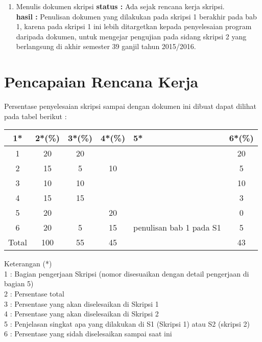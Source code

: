 \documentclass[a4paper,twoside]{article}
\begin{document}
\begin{enumerate}
		\item Menulis dokumen skripsi
		{\bf status :} Ada sejak rencana kerja skripsi.\\
		{\bf hasil :} Penulisan dokumen yang dilakukan pada skripsi 1 berakhir pada bab 1, karena pada skripsi 1 ini lebih ditargetkan kepada penyelesaian program daripada dokumen, untuk mengejar pengujian pada sidang skripsi 2 yang berlangsung di akhir semester 39 ganjil tahun 2015/2016. 
	
	\end{enumerate}

\section{Pencapaian Rencana Kerja}
Persentase penyelesaian skripsi sampai dengan dokumen ini dibuat dapat dilihat pada tabel berikut :

\begin{center}
  \begin{tabular}{ | c | c | c | c | l | c |}
    \hline
    1*  & 2*(\%) & 3*(\%) & 4*(\%) &5* &6*(\%)\\ \hline \hline
    1   & 20  & 20  &  & & 20 \\ \hline
    2   & 15 & 5  & 10  & & 5 \\ \hline
    3   & 10  & 10  &  &  & 10 \\ \hline
    4   & 15  & 15  &   &  & 3 \\ \hline
    5   & 20 &   & 20 & & 0 \\ \hline
    6   & 20 & 	5 & 15  & {\footnotesize penulisan bab 1 pada S1}  & 5 \\\hline
    Total  & 100  & 55  & 45 &  & 43\\ \hline
                          \end{tabular}
\end{center}

Keterangan (*)\\
1 : Bagian pengerjaan Skripsi (nomor disesuaikan dengan detail pengerjaan di bagian 5)\\
2 : Persentase total \\
3 : Persentase yang akan diselesaikan di Skripsi 1 \\
4 : Persentase yang akan diselesaikan di Skripsi 2 \\
5 : Penjelasan singkat apa yang dilakukan di S1 (Skripsi 1) atau S2 (skripsi 2)\\
6 : Persentase yang sidah diselesaikan sampai saat ini 
\end{document}
